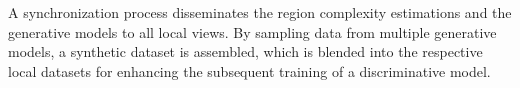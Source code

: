 A synchronization process disseminates the region complexity estimations and the generative models to all local views. By sampling data from multiple generative models, a synthetic dataset is assembled, which is blended into the respective local datasets for enhancing the subsequent training of a discriminative model.